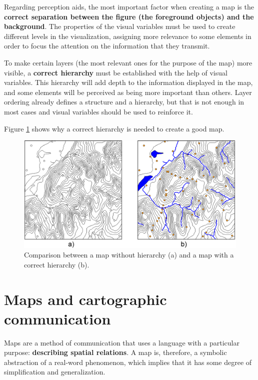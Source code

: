 Regarding perception aids, the most important factor when creating a map is the \textbf{correct separation between the figure (the foreground objects) and the background}. The properties of the visual variables must be used to create different levels in the visualization, assigning more relevance to some elements in order to focus the attention on the information that they transmit.

To make certain layers (the most relevant ones for the purpose of the map) more visible, a \textbf{correct hierarchy} must be established with the help of visual variables. This hierarchy will add depth to the information displayed in the map, and some elements will be perceived as being more important than others. Layer ordering already defines a structure and a hierarchy, but that is not enough in most cases and visual variables should be used to reinforce it.

Figure \ref{Fig:HierarchyMap} shows why a correct hierarchy is needed to create a good map.

\begin{figure}[!hbt]
\centering
\includegraphics[width=\columnwidth]{Visualization/HierarchyMap.png}
\caption{\small Comparison between a map without hierarchy (a) and a map with a correct hierarchy (b).}
\label{Fig:HierarchyMap} 
\end{figure}


\section{Maps and cartographic communication}

Maps are a method of communication that uses a language with a particular purpose: \textbf{describing spatial relations}. A map is, therefore, a symbolic abstraction of a real-word phenomenon, which implies that it has some degree of simplification and generalization.

